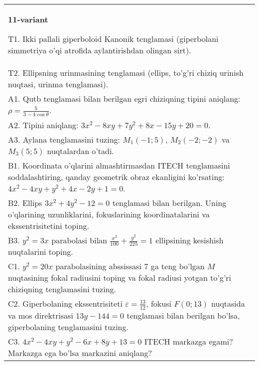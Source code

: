 \documentclass{article}
\begin{document}
\begin{tabular}{m{17cm}}
\textbf{11-variant}
\newline

T1. Ikki pallali giperboloid Kanonik tenglamasi (giperbolani simmetriya o'qi atrofida aylantirishdan olingan sirt).\\

T2. Ellipsning urinmasining tenglamasi (ellips, to'g'ri chiziq urinish nuqtasi, urinma tenglamasi).\\

A1. Qutb tenglamasi bilan berilgan egri chiziqning tipini aniqlang: $\rho=\frac{5}{3-4\cos\theta}$.\\

A2. Tipini aniqlang: $3x^{2}-8xy+7y^{2}+8x-15y+20=0$.\\

A3. Aylana tenglamasini tuzing: $M_1(-1;5)$, $M_2(-2;-2)$ va $M_3(5;5)$ nuqtalardan o'tadi.\\

B1. Koordinata o'qlarini almashtirmasdan ITECH tenglamasini soddalashtiring, qanday geometrik obraz ekanligini ko'rsating: $4x^{2} - 4xy + y^{2} + 4x - 2y + 1 = 0$.  \\

B2. Ellips $3x^{2} + 4y^{2} - 12 = 0$ tenglamasi bilan berilgan. Uning o'qlarining uzunliklarini, fokuslarining koordinatalarini va ekssentrisitetini toping.  \\

B3. $y^{2} = 3x$ parabolasi bilan $\frac{x^{2}}{100} + \frac{y^{2}}{225} = 1$ ellipsining kesishish nuqtalarini toping.  \\

C1. $y^{2} = 20x$ parabolasining abssissasi 7 ga teng bo'lgan $M$ nuqtasining fokal radiusini toping va fokal radiusi yotgan to'g'ri chiziqning tenglamasini tuzing.  \\

C2. Giperbolaning ekssentrisiteti $\varepsilon = \frac{13}{12}$, fokusi $F(0;13)$ nuqtasida va mos direktrisasi $13y - 144 = 0$ tenglamasi bilan berilgan bo'lsa, giperbolaning tenglamasini tuzing.  \\

C3. $4x^{2} - 4xy + y^{2} - 6x + 8y + 13 = 0$ ITECH markazga egami? Markazga ega bo'lsa markazini aniqlang?  \\

\end{tabular}
\vspace{1cm}
\end{document}
